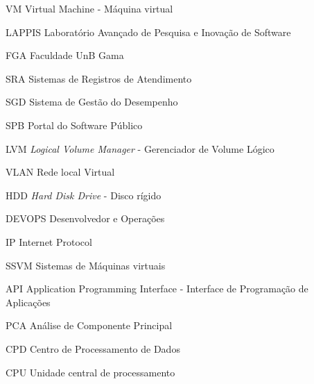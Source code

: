 \begin{siglas}
  \item[VM] Virtual Machine - Máquina virtual
  \item[LAPPIS] Laboratório Avançado de Pesquisa e Inovação de Software
  \item[FGA] Faculdade UnB Gama
  \item[SRA] Sistemas de Registros de Atendimento
  \item[SGD] Sistema de Gestão do Desempenho
  \item[SPB] Portal do Software Público
  \item[LVM] \textit{Logical Volume Manager} - Gerenciador de Volume Lógico
  \item[VLAN] Rede local Virtual
  \item[HDD] \textit{Hard Disk Drive} - Disco rígido
  \item[DEVOPS] Desenvolvedor e Operações
  \item[IP] Internet Protocol
  \item [SSVM] Sistemas de Máquinas virtuais
  \item [API] Application Programming Interface - Interface de Programação de Aplicações 
  \item [PCA] Análise de Componente Principal
  \item [CPD] Centro de Processamento de Dados
  \item [CPU] Unidade central de processamento
\end{siglas}

